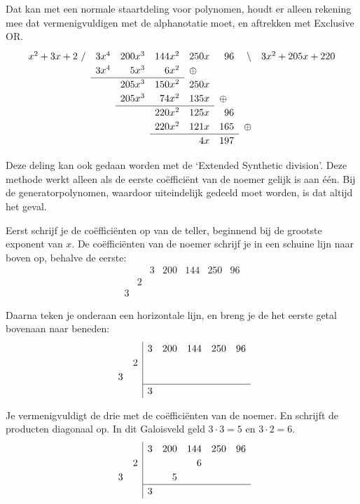 \documentclass[a4paper]{article}
\begin{document}
Dat kan met een normale staartdeling voor polynomen, houdt er alleen rekening mee dat vermenigvuldigen met de alphanotatie moet, en aftrekken met Exclusive OR.
\[
\renewcommand\arraystretch{1.2}
\begin{array}{rrrrrrrr}
x^2+3x+2\text{ /} & 3x^4 & 200x^3 & 144x^2 & 250x & 96 & \text{\textbackslash} & 3x^2+205x+220\\
&3x^4 & 5x^3 & 6x^2 & \multicolumn{1}{l}{\xor}\\\cline{2-4}
&&205x^3 & 150x^2 & 250x\\
&&205x^3 & 74x^2 & 135x & \multicolumn{1}{l}{\xor} \\\cline{3-5}
&&&220x^2 & 125x & 96\\
&&&220x^2 & 121x & 165 & \multicolumn{1}{l}{\xor} \\\cline{4-6}
&&&&4x & 197
\end{array}
\]

Deze deling kan ook gedaan worden met de `Extended Synthetic division'. Deze methode werkt alleen als de eerste coëfficiënt van de noemer gelijk is aan één. Bij de generatorpolynomen, waardoor uiteindelijk gedeeld moet worden, is dat altijd het geval.

Eerst schrijf je de coëfficiënten op van de teller, beginnend bij de grootste exponent van $x$. De coëfficiënten van de noemer schrijf je in een schuine lijn naar boven op, behalve de eerste:
\[\begin{array}{rr|rrrrr}
&&3&200&144&250&96\\
&2\\
3&&
\end{array}\]

Daarna teken je onderaan een horizontale lijn, en breng je de het eerste getal bovenaan naar beneden:
\[\begin{array}{rr|rrrrr}
&&3&200&144&250&96\\
&2\\
3&&\\\cline{3-7}
&&3
\end{array}\]

Je vermenigvuldigt de drie met de coëfficiënten van de noemer. En schrijft de producten diagonaal op. In dit Galoisveld geld $3\cdot3=5$ en $3\cdot2=6$.
\[\begin{array}{rr|rrrrr}
&&3&200&144&250&96\\
&2&&&6\\
3&&&5\\\cline{3-7}
&&3
\end{array}\]
\end{document}
